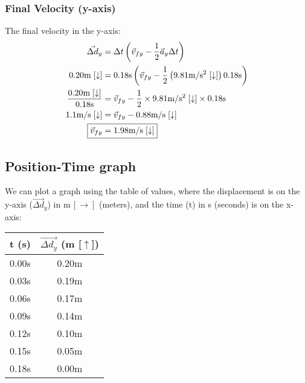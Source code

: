 \documentclass[a4paper,12pt]{article}
\begin{document}
	\subsubsection{Final Velocity (y-axis)}
	The final velocity in the y-axis:
	\begin{align*}
		\vec{\Delta d}_y&=\Delta t\left(\vec{v}_{fy}-\frac{1}{2}\vec{a}_y\Delta t\right)\\
		0.20\text{m}\;[\downarrow]&=0.18\text{s}\left(\vec{v}_{fy}-\frac{1}{2}\left(9.81\text{m}/\text{s}^2\;[\downarrow]\right)0.18\text{s}\right)\\
		\frac{0.20\text{m}\;[\downarrow]}{0.18\text{s}}&=\vec{v}_{fy}-\frac{1}{2}\times9.81\text{m}/\text{s}^2\;[\downarrow]\times0.18\text{s}\\
		1.1\text{m}/\text{s}\;[\downarrow]&=\vec{v}_{fy}-0.88\text{m}/\text{s}\;[\downarrow]\\
		\Aboxed{\vec{v}_{fy}&=1.98\text{m}/\text{s}\;[\downarrow]}
	\end{align*}
	\newpage
	\subsection{Position-Time graph}
	We can plot a graph using the table of values, where the displacement is on the y-axis ($\vec{\Delta d}_y$) in $\text{m} \,[\rightarrow]$ (meters), and the time (t) in s (seconds) is on the x-axis:
	\bigskip
	\bigskip
	\begin{center}
		\begin{tabular}{ |c|c| } 
			\hline
			t (s) & $\vec{\Delta d_y}$ (m [$\uparrow$]) \\ 
			\hline\hline
			0.00s & 0.20m \\
			\hline 
			0.03s & 0.19m \\ 
			\hline
			0.06s & 0.17m \\
			\hline
			0.09s & 0.14m \\
			\hline
			0.12s & 0.10m \\
			\hline
			0.15s & 0.05m \\
			\hline
			0.18s & 0.00m \\
			\hline
		\end{tabular} 
	\end{center}
	\bigskip
	\bigskip
	\bigskip
\end{document}
